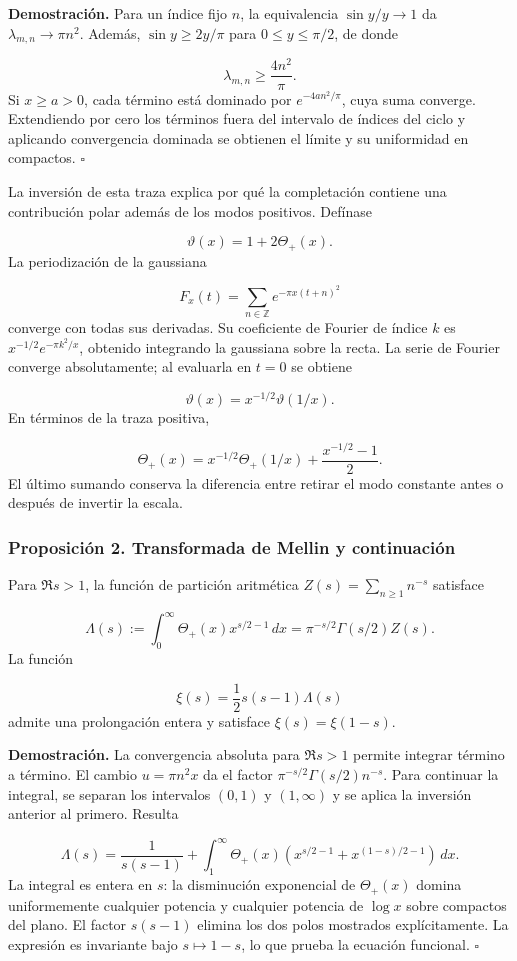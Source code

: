 \textbf{Demostración.} Para un índice fijo \(n\), la equivalencia \(\sin y/y\to1\) da \(\lambda_{m,n}\to\pi n^2\). Además, \(\sin y\geq2y/\pi\) para \(0\leq y\leq\pi/2\), de donde

\[
\lambda_{m,n}\geq\frac{4n^2}{\pi}.
\]
Si \(x\geq a>0\), cada término está dominado por \(e^{-4an^2/\pi}\), cuya suma converge. Extendiendo por cero los términos fuera del intervalo de índices del ciclo y aplicando convergencia dominada se obtienen el límite y su uniformidad en compactos. \hfill\(\square\)

La inversión de esta traza explica por qué la completación contiene una contribución polar además de los modos positivos. Defínase

\[
\vartheta(x)=1+2\Theta_+(x).
\]
La periodización de la gaussiana

\[
F_x(t)=\sum_{n\in\mathbb Z}e^{-\pi x(t+n)^2}
\]
converge con todas sus derivadas. Su coeficiente de Fourier de índice \(k\) es \(x^{-1/2}e^{-\pi k^2/x}\), obtenido integrando la gaussiana sobre la recta. La serie de Fourier converge absolutamente; al evaluarla en \(t=0\) se obtiene

\[
\vartheta(x)=x^{-1/2}\vartheta(1/x).
\]
En términos de la traza positiva,

\[
\Theta_+(x)=x^{-1/2}\Theta_+(1/x)+\frac{x^{-1/2}-1}{2}.
\]
El último sumando conserva la diferencia entre retirar el modo constante antes o después de invertir la escala.

\subsubsection*{Proposición 2. Transformada de Mellin y continuación}
Para \(\Re s>1\), la función de partición aritmética \(Z(s)=\sum_{n\geq1}n^{-s}\) satisface

\[
\Lambda(s):=\int_0^\infty\Theta_+(x)x^{s/2-1}\,dx
=\pi^{-s/2}\Gamma(s/2)Z(s).
\]
La función

\[
\xi(s)=\frac12s(s-1)\Lambda(s)
\]
admite una prolongación entera y satisface \(\xi(s)=\xi(1-s)\).

\textbf{Demostración.} La convergencia absoluta para \(\Re s>1\) permite integrar término a término. El cambio \(u=\pi n^2x\) da el factor \(\pi^{-s/2}\Gamma(s/2)n^{-s}\). Para continuar la integral, se separan los intervalos \((0,1)\) y \((1,\infty)\) y se aplica la inversión anterior al primero. Resulta

\[
\Lambda(s)=\frac1{s(s-1)}
+\int_1^\infty\Theta_+(x)
\left(x^{s/2-1}+x^{(1-s)/2-1}\right)\,dx.
\]
La integral es entera en \(s\): la disminución exponencial de \(\Theta_+(x)\) domina uniformemente cualquier potencia y cualquier potencia de \(\log x\) sobre compactos del plano. El factor \(s(s-1)\) elimina los dos polos mostrados explícitamente. La expresión es invariante bajo \(s\mapsto1-s\), lo que prueba la ecuación funcional. \hfill\(\square\)

